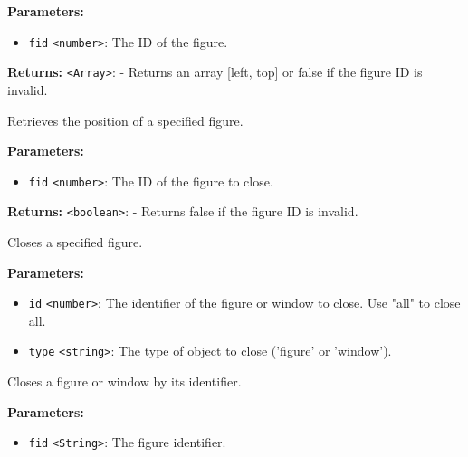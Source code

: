 \documentclass[12pt,a4paper]{article}
\begin{document}
\noindent \textbf{Parameters:}
\begin{itemize}
  \item \texttt{fid} \texttt{<number>}: The ID of the figure.
\end{itemize}

\noindent \textbf{Returns:} \texttt{<Array>}: - Returns an array [left, top] or false if the figure ID is invalid.

\noindent Retrieves the position of a specified figure.

\vspace{5mm}
\noindent {}


\noindent \textbf{Parameters:}
\begin{itemize}
  \item \texttt{fid} \texttt{<number>}: The ID of the figure to close.
\end{itemize}

\noindent \textbf{Returns:} \texttt{<boolean>}: - Returns false if the figure ID is invalid.

\noindent Closes a specified figure.

\vspace{5mm}
\noindent {}


\noindent \textbf{Parameters:}
\begin{itemize}
  \item \texttt{id} \texttt{<number>}: The identifier of the figure or window to close. Use "all" to close all.
  \item \texttt{type} \texttt{<string>}: The type of object to close ('figure' or 'window').
\end{itemize}

\noindent Closes a figure or window by its identifier.

\vspace{5mm}
\noindent {}


\noindent \textbf{Parameters:}
\begin{itemize}
  \item \texttt{fid} \texttt{<String>}: The figure identifier.
\end{itemize}
\end{document}

